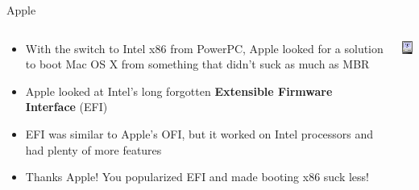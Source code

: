 \documentclass{lug}
\begin{document}
\begin{frame}{Apple}
    \begin{columns}
        \begin{column}{0.75\textwidth}
            \begin{itemize}[<+->]
                \item With the switch to Intel x86 from PowerPC, Apple looked
                    for a solution to boot Mac OS X from something that didn't
                    suck as much as MBR
                \item Apple looked at Intel's long forgotten \textbf{Extensible
                    Firmware Interface} (EFI)
                \item EFI was similar to Apple's OFI, but it worked on Intel
                    processors and had plenty of more features
                \item Thanks Apple! You popularized EFI and made booting x86
                    suck less!
            \end{itemize}
        \end{column}
        \begin{column}{0.25\textwidth}
            \includegraphics[width=\textwidth]{graphics/happymac}
        \end{column}
    \end{columns}
\end{frame}
\end{document}
